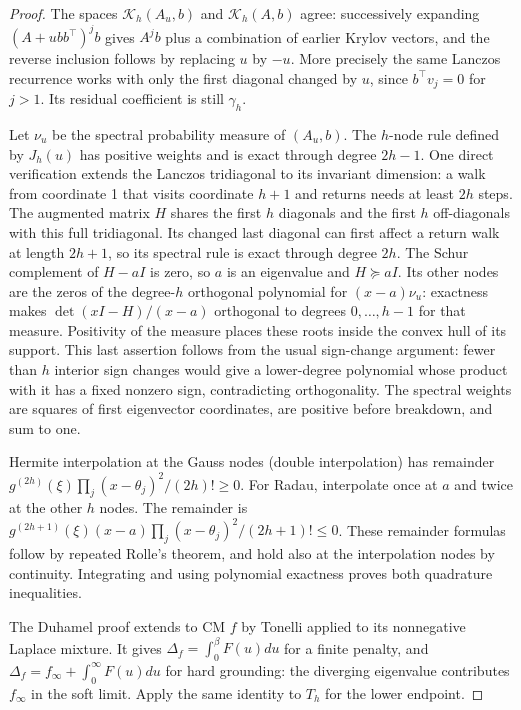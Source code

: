 \documentclass[11pt]{article}
\begin{document}
\begin{proof}
The spaces $\mathcal K_h(A_u,b)$ and $\mathcal K_h(A,b)$ agree:
successively expanding $(A+ubb^\top)^j b$ gives $A^jb$ plus a
combination of earlier Krylov vectors, and the reverse inclusion
follows by replacing $u$ by $-u$. More precisely the same Lanczos
recurrence works with only the first diagonal changed by $u$, since
$b^\top v_j=0$ for $j>1$. Its residual coefficient is still $\gamma_h$.

Let $\nu_u$ be the spectral probability measure of $(A_u,b)$.
The $h$-node rule defined by $J_h(u)$ has positive weights and is exact
through degree $2h-1$. One direct verification extends the Lanczos
tridiagonal to its invariant dimension: a walk from coordinate 1
that visits coordinate $h+1$ and returns needs at least $2h$ steps.
The augmented matrix $H$ shares the first $h$ diagonals and the first
$h$ off-diagonals with this full tridiagonal. Its changed last diagonal
can first affect a return walk at length $2h+1$, so its spectral rule
is exact through degree $2h$.
The Schur complement of $H-aI$ is zero, so $a$ is an eigenvalue and
$H\succeq aI$. Its other nodes are the zeros of the degree-$h$
orthogonal polynomial for $(x-a)\nu_u$: exactness makes
$\det(xI-H)/(x-a)$ orthogonal to degrees $0,\ldots,h-1$ for that
measure. Positivity of the measure places these roots inside the
convex hull of its support. This last assertion follows from the
usual sign-change argument: fewer than $h$ interior sign changes
would give a lower-degree polynomial whose product with it has a
fixed nonzero sign, contradicting orthogonality.
The spectral weights are squares of first eigenvector coordinates,
are positive before breakdown, and sum to one.

Hermite interpolation at the Gauss nodes (double interpolation)
has remainder
$g^{(2h)}(\xi)\prod_j(x-\theta_j)^2/(2h)!\geq0$.
For Radau, interpolate once at $a$ and twice at the other $h$ nodes.
The remainder is
$g^{(2h+1)}(\xi)(x-a)\prod_j(x-\theta_j)^2/(2h+1)!\leq0$.
These remainder formulas follow by repeated Rolle's theorem, and
hold also at the interpolation nodes by continuity. Integrating
and using polynomial exactness proves both quadrature inequalities.

The Duhamel proof extends to CM $f$ by Tonelli applied to its
nonnegative Laplace mixture. It gives $\Delta_f=\int_0^\beta F(u)du$
for a finite penalty, and $\Delta_f=f_\infty+\int_0^\infty F(u)du$
for hard grounding: the diverging eigenvalue contributes
$f_\infty$ in the soft limit. Apply the same identity to $T_h$ for
the lower endpoint.


\end{proof}
\end{document}
